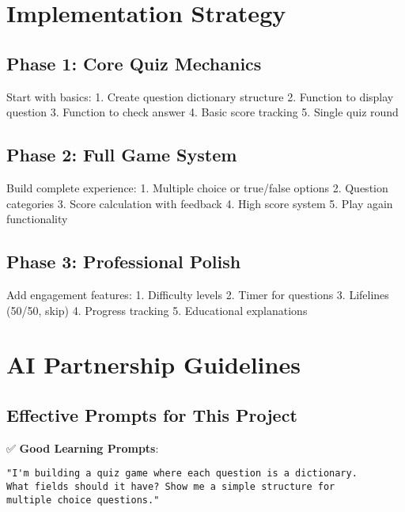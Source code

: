 \documentclass[
  letterpaper,
  DIV=11,
  numbers=noendperiod,
  oneside]{scrreprt}
\begin{document}
\section{Implementation Strategy}\label{implementation-strategy-7}

\subsection{Phase 1: Core Quiz
Mechanics}\label{phase-1-core-quiz-mechanics}

Start with basics: 1. Create question dictionary structure 2. Function
to display question 3. Function to check answer 4. Basic score tracking
5. Single quiz round

\subsection{Phase 2: Full Game System}\label{phase-2-full-game-system}

Build complete experience: 1. Multiple choice or true/false options 2.
Question categories 3. Score calculation with feedback 4. High score
system 5. Play again functionality

\subsection{Phase 3: Professional
Polish}\label{phase-3-professional-polish}

Add engagement features: 1. Difficulty levels 2. Timer for questions 3.
Lifelines (50/50, skip) 4. Progress tracking 5. Educational explanations

\section{AI Partnership Guidelines}\label{ai-partnership-guidelines-7}

\subsection{Effective Prompts for This
Project}\label{effective-prompts-for-this-project-7}

✅ \textbf{Good Learning Prompts}:

\begin{verbatim}
"I'm building a quiz game where each question is a dictionary. 
What fields should it have? Show me a simple structure for 
multiple choice questions."
\end{verbatim}
\end{document}
